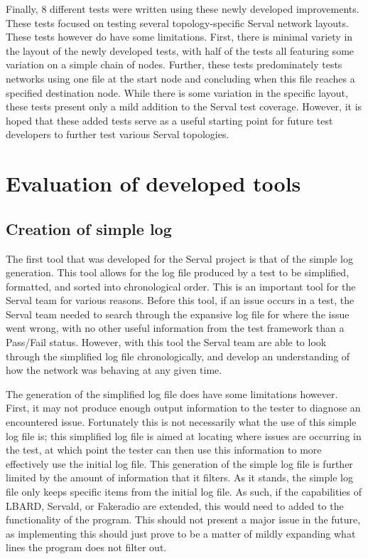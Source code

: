 Finally, 8 different tests were written using these newly developed improvements.
These tests focused on testing several topology-specific Serval network layouts.
These tests however do have some limitations. First, there is minimal variety in the layout of the newly developed tests, with half of the tests all featuring some variation on a simple chain of nodes.
Further, these tests predominately tests networks using one file at the start node and concluding when this file reaches a specified destination node.
While there is some variation in the specific layout, these tests present only a mild addition to the Serval test coverage.
However, it is hoped that these added tests serve as a useful starting point for future test developers to further test various Serval topologies.


\section{Evaluation of developed tools}

\subsection{Creation of simple log}
The first tool that was developed for the Serval project is that of the simple log generation.
This tool allows for the log file produced by a test to be simplified, formatted, and sorted into chronological order.
This is an important tool for the Serval team for various reasons.
Before this tool, if an issue occurs in a test, the Serval team needed to search through the expansive log file for where the issue went wrong, with no other useful information from the test framework than a Pass/Fail status.
However, with this tool the Serval team are able to look through the simplified log file chronologically, and develop an understanding of how the network was behaving at any given time.

The generation of the simplified log file does have some limitations however.
First, it may not produce enough output information to the tester to diagnose an encountered issue.
Fortunately this is not necessarily what the use of this simple log file is; this simplified log file is aimed at locating where issues are occurring in the test, at which point the tester can then use this information to more effectively use the initial log file.
This generation of the simple log file is further limited by the amount of information that it filters.
As it stands, the simple log file only keeps specific items from the initial log file.
As such, if the capabilities of LBARD, Servald, or Fakeradio are extended, this would need to added to the functionality of the program.
This should not present a major issue in the future, as implementing this should just prove to be a matter of mildly expanding what lines the program does not filter out.

